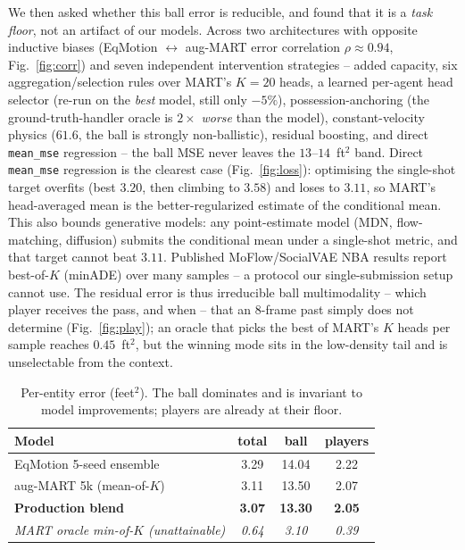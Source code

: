 \documentclass{article} %
\begin{document}
We then asked whether this ball error is reducible, and found that it is a
\emph{task floor}, not an artifact of our models. Across two architectures with
opposite inductive biases (EqMotion ${\leftrightarrow}$ aug-MART error
correlation $\rho\!\approx\!0.94$, Fig.~\ref{fig:corr}) and seven independent
intervention strategies
-- added capacity, six aggregation/selection rules over MART's $K{=}20$ heads, a
learned per-agent head selector (re-run on the \emph{best} model, still only
$-5\%$), possession-anchoring (the ground-truth-handler oracle is $2\times$
\emph{worse} than the model), constant-velocity physics ($61.6$, the ball is
strongly non-ballistic), residual boosting, and direct \texttt{mean\_mse}
regression -- the ball MSE never leaves the $13$--$14$~ft$^2$ band. Direct
\texttt{mean\_mse} regression is the clearest case (Fig.~\ref{fig:loss}):
optimising the single-shot target overfits (best $3.20$, then climbing to $3.58$)
and loses to $3.11$, so MART's head-averaged mean is the better-regularized
estimate of the conditional mean. This also bounds generative models: any
point-estimate model (MDN, flow-matching, diffusion) submits the conditional mean
under a single-shot metric, and that target cannot beat $3.11$. Published
MoFlow/SocialVAE NBA results report best-of-$K$ (minADE) over many samples -- a
protocol our single-submission setup cannot use. The residual error is thus irreducible ball
multimodality -- which player receives the pass, and when -- that an 8-frame past
simply does not determine (Fig.~\ref{fig:play}); an oracle that picks the best of
MART's $K$ heads per sample reaches $0.45$~ft$^2$, but the winning mode sits in the
low-density tail and is unselectable from the context.

\begin{table}[t]
\caption{Per-entity error (feet$^2$). The ball dominates and is invariant to
model improvements; players are already at their floor.}
\label{tab:ball}
\begin{center}
\begin{tabular}{lccc}
\toprule
Model & total & ball & players \\
\midrule
EqMotion 5-seed ensemble          & 3.29 & 14.04 & 2.22 \\
aug-MART 5k (mean-of-$K$)          & 3.11 & 13.50 & 2.07 \\
\textbf{Production blend}          & \textbf{3.07} & \textbf{13.30} & \textbf{2.05} \\
\midrule
\emph{MART oracle min-of-$K$ (unattainable)} & \emph{0.64} & \emph{3.10} & \emph{0.39} \\
\bottomrule
\end{tabular}
\end{center}
\end{table}
\end{document}
